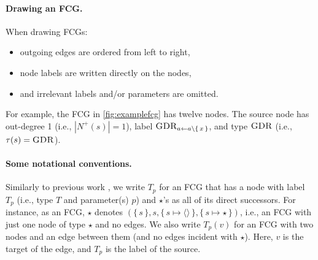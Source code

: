 
\paragraph{Drawing an FCG.}
When drawing FCGs:
\begin{itemize}
  \item outgoing edges are ordered from left to right,
  \item node labels are written directly on the nodes,
  \item and irrelevant labels and/or parameters are omitted.
\end{itemize}
For example, the FCG in \cref{fig:examplefcg} has twelve nodes. The source
node has out-degree 1 (i.e., $|N^+(s)| = 1$), label
$\operatorname{\textsc{GDR}}_{a \gets a \setminus \{\, x \,\}}$, and type $\operatorname{\textsc{GDR}}$ (i.e.,
$\tau(s) = \operatorname{\textsc{GDR}}$).

\paragraph{Some notational conventions.}
Similarly to previous work \citep{DBLP:conf/ijcai/BroeckTMDR11}, we write $T_p$
for an FCG that has a node with label $T_p$ (i.e., type $T$ and parameter(s)
$p$) and $\star$'s as all of its direct successors. For instance, as an FCG,
$\star$ denotes
$(\{\, s \,\}, s, \{\, s \mapsto \langle\rangle \,\}, \{\, s \mapsto \star \,\})$,
i.e., an FCG with just one node of type $\star$ and no edges. We also write
$T_p(v)$ for an FCG with two nodes and an edge between them (and no edges
incident with $\star$). Here, $v$ is the target of the edge, and $T_p$ is the
label of the source.

